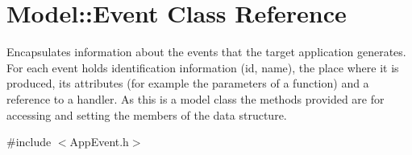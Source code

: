 \hypertarget{class_model_1_1_event}{\section{Model\-:\-:Event Class Reference}
\label{class_model_1_1_event}
}


Encapsulates information about the events that the target application generates. For each event holds identification information (id, name), the place where it is produced, its attributes (for example the parameters of a function) and a reference to a handler. As this is a model class the methods provided are for accessing and setting the members of the data structure.  




{\ttfamily \#include $<$App\-Event.\-h$>$}

